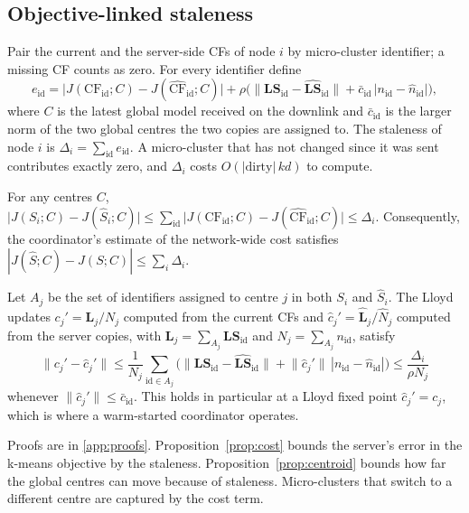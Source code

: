 \subsection{Objective-linked staleness}
Pair the current and the server-side CFs of node $i$ by micro-cluster identifier; a missing CF counts as zero. For every identifier define
\begin{equation}\label{eq:eid}
e_{\mathrm{id}}=\big|J(\mathrm{CF}_{\mathrm{id}};C)-J(\widehat{\mathrm{CF}}_{\mathrm{id}};C)\big|
+\rho\Big(\lVert \mathbf{LS}_{\mathrm{id}}-\widehat{\mathbf{LS}}_{\mathrm{id}}\rVert+\bar c_{\mathrm{id}}\,\big|n_{\mathrm{id}}-\hat n_{\mathrm{id}}\big|\Big),
\end{equation}
where $C$ is the latest global model received on the downlink and $\bar c_{\mathrm{id}}$ is the larger norm of the two global centres the two copies are assigned to. The staleness of node $i$ is $\Delta_i=\sum_{\mathrm{id}}e_{\mathrm{id}}$. A micro-cluster that has not changed since it was sent contributes exactly zero, and $\Delta_i$ costs $O(|\text{dirty}|\,kd)$ to compute.

\begin{proposition}\label{prop:cost}
For any centres $C$, $\big|J(S_i;C)-J(\hat S_i;C)\big|\le\sum_{\mathrm{id}}\big|J(\mathrm{CF}_{\mathrm{id}};C)-J(\widehat{\mathrm{CF}}_{\mathrm{id}};C)\big|\le\Delta_i$. Consequently, the coordinator's estimate of the network-wide cost satisfies $|J(\hat S;C)-J(S;C)|\le\sum_i\Delta_i$.
\end{proposition}

\begin{proposition}\label{prop:centroid}
Let $A_j$ be the set of identifiers assigned to centre $j$ in both $S_i$ and $\hat S_i$. The Lloyd updates $c_j'=\mathbf{L}_j/N_j$ computed from the current CFs and $\hat c_j'=\hat{\mathbf{L}}_j/\hat N_j$ computed from the server copies, with $\mathbf{L}_j=\sum_{A_j}\mathbf{LS}_{\mathrm{id}}$ and $N_j=\sum_{A_j}n_{\mathrm{id}}$, satisfy
\[
\lVert c_j'-\hat c_j'\rVert\le\frac{1}{N_j}\sum_{\mathrm{id}\in A_j}\Big(\lVert\mathbf{LS}_{\mathrm{id}}-\widehat{\mathbf{LS}}_{\mathrm{id}}\rVert+\lVert\hat c_j'\rVert\,|n_{\mathrm{id}}-\hat n_{\mathrm{id}}|\Big)\le\frac{\Delta_i}{\rho N_j}
\]
whenever $\lVert\hat c_j'\rVert\le\bar c_{\mathrm{id}}$. This holds in particular at a Lloyd fixed point $\hat c_j'=c_j$, which is where a warm-started coordinator operates.
\end{proposition}

Proofs are in \ref{app:proofs}. Proposition~\ref{prop:cost} bounds the server's error in the k-means objective by the staleness. Proposition~\ref{prop:centroid} bounds how far the global centres can move because of staleness. Micro-clusters that switch to a different centre are captured by the cost term.


